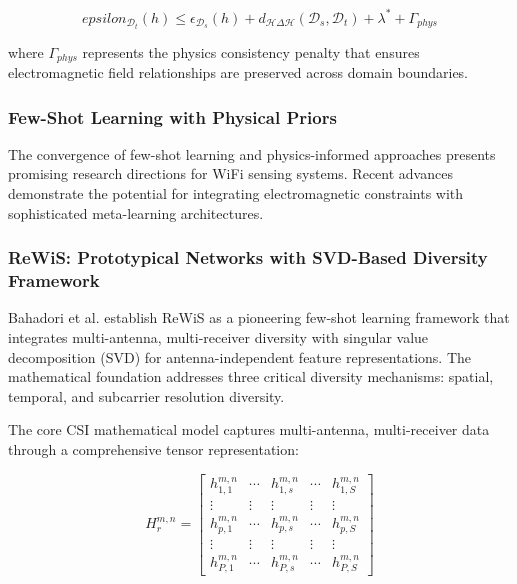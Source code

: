 \documentclass[journal]{IEEEtran}
\begin{document}
\begin{equation}
epsilon_{\mathcal{D}_t}(h) \leq \epsilon_{\mathcal{D}_s}(h) + d_{\mathcal{H}\Delta\mathcal{H}}(\mathcal{D}_s, \mathcal{D}_t) + \lambda^* + \Gamma_{phys}
\label{eq:domain_bound_physics}
\end{equation}

where $\Gamma_{phys}$ represents the physics consistency penalty that ensures electromagnetic field relationships are preserved across domain boundaries.

\subsubsection{Few-Shot Learning with Physical Priors}

The convergence of few-shot learning and physics-informed approaches presents promising research directions for WiFi sensing systems. Recent advances demonstrate the potential for integrating electromagnetic constraints with sophisticated meta-learning architectures.

\subsubsection{ReWiS: Prototypical Networks with SVD-Based Diversity Framework}

Bahadori et al. \cite{bahadori2022rewis} establish ReWiS as a pioneering few-shot learning framework that integrates multi-antenna, multi-receiver diversity with singular value decomposition (SVD) for antenna-independent feature representations. The mathematical foundation addresses three critical diversity mechanisms: spatial, temporal, and subcarrier resolution diversity.

The core CSI mathematical model captures multi-antenna, multi-receiver data through a comprehensive tensor representation:

\begin{equation}
H^{m,n}_r = \begin{bmatrix}
h^{m,n}_{1,1} & \cdots & h^{m,n}_{1,s} & \cdots & h^{m,n}_{1,S} \\
\vdots & \vdots & \vdots & \vdots & \vdots \\
h^{m,n}_{p,1} & \cdots & h^{m,n}_{p,s} & \cdots & h^{m,n}_{p,S} \\
\vdots & \vdots & \vdots & \vdots & \vdots \\
h^{m,n}_{P,1} & \cdots & h^{m,n}_{P,s} & \cdots & h^{m,n}_{P,S}
\end{bmatrix}
\label{eq:rewis_csi_matrix}
\end{equation}
\end{document}
